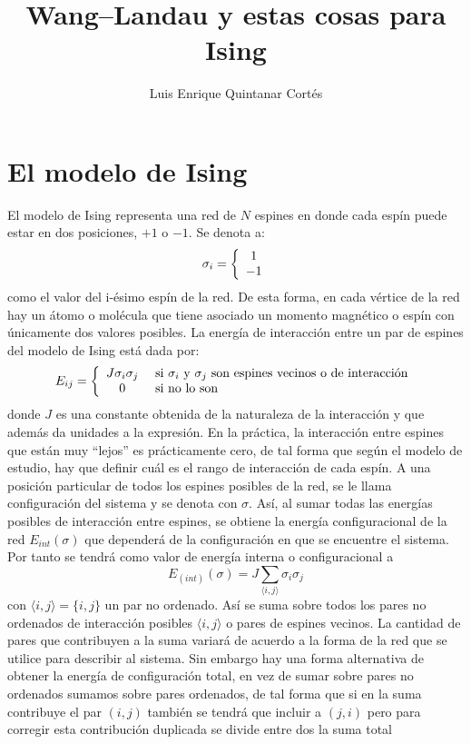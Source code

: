\documentclass[12pt]{book}
\author{Luis Enrique Quintanar Cortés}
\title{Wang--Landau y estas cosas para Ising }
\begin{document}
\maketitle


\chapter{El modelo de Ising}

El modelo de Ising representa una red de $N$ espines en donde cada espín puede estar en
 dos posiciones, $+1$ o $-1$. Se denota a:
\begin{equation}
 \sigma_i = \left\{
\begin{array}{c l}
 1 \\
 -1 
\end{array}
\right.
\end{equation}
como el valor del i-ésimo espín de la red.
De esta forma, en cada vértice de la red hay un átomo o molécula que tiene asociado un momento
 magnético o espín con únicamente dos valores posibles.
La energía de interacción entre un par de espines del modelo de Ising  está dada por: 
\begin{equation}
 E_{i j}=  \left\{
\begin{array}{c l}
 J \sigma_i \sigma_j & \text{ si $\sigma_{i}$ y $\sigma_{j}$ son espines vecinos o de interacción} \\
0 & \text{ si no lo son} 
\end{array}
\right.
\end{equation}
donde  $J$ es una constante obtenida de la naturaleza de la interacción y que además da unidades a la expresión. En la práctica, la interacción entre espines que están muy ``lejos'' es 
 prácticamente cero, de tal forma que según el modelo de estudio, hay que definir cuál es el rango de interacción de cada espín.
A una posición particular de todos los espines posibles de la red, se le llama configuración del sistema y se denota con $\sigma$. Así, al sumar todas las energías posibles de interacción entre espines, se obtiene la energía configuracional de la red  $E_{int}(\sigma)$ que dependerá de la configuración en que se encuentre el sistema. Por tanto se tendrá como valor de energía interna o configuracional a
\begin{equation}
	E_{(int)}(\sigma)= J \sum_{\langle i,j \rangle} \sigma_{i}\sigma_{j}
\end{equation}
con $\langle i,j \rangle =\{i,j\}$ un par no ordenado. Así se suma sobre todos los pares no ordenados de interacción posibles $\langle i,j \rangle$ o pares de espines vecinos. La cantidad de pares que contribuyen a la suma variará de acuerdo a la forma de la red que se utilice para describir al sistema. Sin embargo hay una forma alternativa de obtener la energía de configuración total, en vez de sumar sobre pares no ordenados sumamos sobre pares ordenados, de tal forma que si en la suma contribuye el par $(i,j)$ también se tendrá que incluir a $(j,i)$ pero para corregir esta contribución duplicada se divide entre dos la suma total
\end{document}
